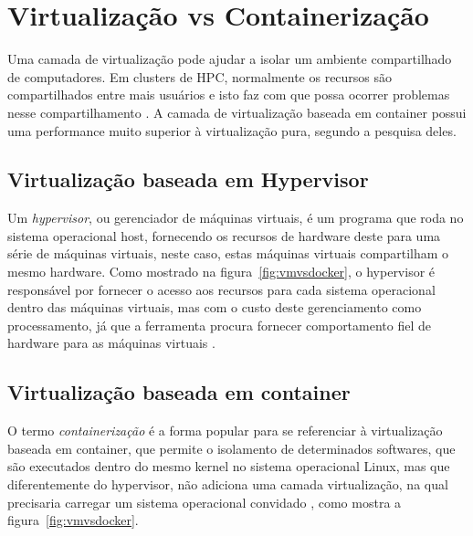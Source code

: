 \documentclass[twoside,english,brazilian]{UNISINOSmonografia}
\begin{document}
\section{Virtualização vs Containerização}
\label{virtualization}

Uma camada de virtualização pode ajudar a isolar um ambiente compartilhado de computadores. Em clusters de HPC, normalmente os recursos são compartilhados entre mais usuários e isto faz com que possa ocorrer problemas nesse compartilhamento \cite{Xavier2013}.
A camada de virtualização baseada em container possui uma performance muito superior à virtualização pura, segundo a pesquisa deles.



\subsection{Virtualização baseada em Hypervisor}
Um \textit{hypervisor}, ou gerenciador de máquinas virtuais, é um programa que roda no sistema operacional host, fornecendo os recursos de hardware deste para uma série de máquinas virtuais, neste caso, estas máquinas virtuais compartilham o mesmo hardware. Como mostrado na figura~\ref{fig:vmvsdocker}, o hypervisor é responsável por fornecer o acesso aos recursos para cada sistema operacional dentro das máquinas virtuais, mas com o custo deste gerenciamento como processamento, já que a ferramenta procura fornecer comportamento fiel de hardware para as máquinas virtuais \cite{Zhang2016}.

\subsection{Virtualização baseada em container}

O termo \textit{containerização} é a forma popular para se referenciar à virtualização baseada em container, que permite o isolamento de determinados softwares, que são executados dentro do mesmo kernel no sistema operacional Linux, mas que diferentemente do hypervisor, não adiciona uma camada virtualização, na qual precisaria carregar um sistema operacional convidado \cite{Zhang2016}, como mostra a figura~\ref{fig:vmvsdocker}.
\cite{Dua2014}
\end{document}
